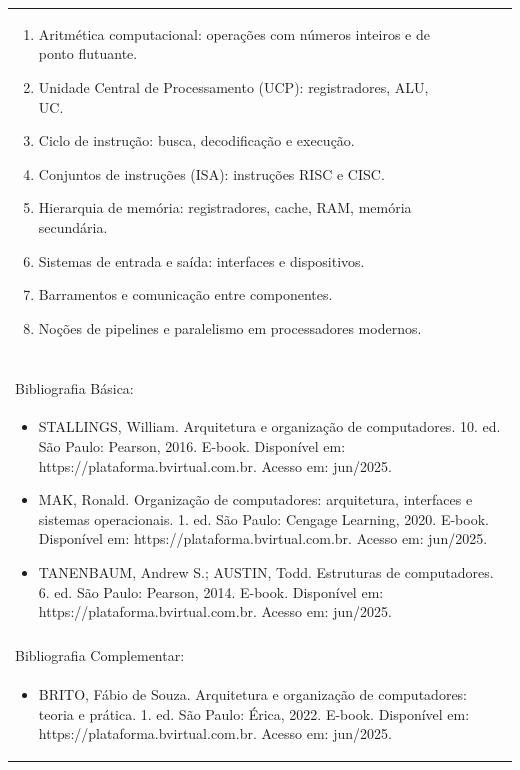 \documentclass[11pt]{article}
\begin{document}
\begin{center}
\begin{longtable}{|p{4cm}|p{4cm}|p{4cm}|p{4cm}|}
{\begin{enumerate}
\item Aritmética computacional: operações com números inteiros e de ponto flutuante.
\item Unidade Central de Processamento (UCP): registradores, ALU, UC.
\item Ciclo de instrução: busca, decodificação e execução.
\item Conjuntos de instruções (ISA): instruções RISC e CISC.
\item Hierarquia de memória: registradores, cache, RAM, memória secundária.
\item Sistemas de entrada e saída: interfaces e dispositivos.
\item Barramentos e comunicação entre componentes.
\item Noções de pipelines e paralelismo em processadores modernos.\end{enumerate}}\\
\multicolumn{4}{|p{16cm}|}{}\\
\multicolumn{4}{|p{16cm}|}{}\\
\multicolumn{4}{|p{16cm}|}{\vspace{-1cm}}\\
\multicolumn{4}{|p{16cm}|}{}\\
\hline
\multicolumn{4}{|p{16cm}|}{Bibliografia Básica:}\\
\multicolumn{4}{|p{16cm}|}{%
\begin{itemize}\item STALLINGS, William. Arquitetura e organização de computadores. 10. ed. São Paulo: Pearson, 2016. E-book. Disponível em: https://plataforma.bvirtual.com.br. Acesso em: jun/2025.
\item MAK, Ronald. Organização de computadores: arquitetura, interfaces e sistemas operacionais. 1. ed. São Paulo: Cengage Learning, 2020. E-book. Disponível em: https://plataforma.bvirtual.com.br. Acesso em: jun/2025.
\item TANENBAUM, Andrew S.; AUSTIN, Todd. Estruturas de computadores. 6. ed. São Paulo: Pearson, 2014. E-book. Disponível em: https://plataforma.bvirtual.com.br. Acesso em: jun/2025.\end{itemize}}\\
\multicolumn{4}{|p{16cm}|}{}\\
\hline
\multicolumn{4}{|p{16cm}|}{Bibliografia Complementar:}\\
\multicolumn{4}{|p{16cm}|}{%
\begin{itemize}\item BRITO, Fábio de Souza. Arquitetura e organização de computadores: teoria e prática. 1. ed. São Paulo: Érica, 2022. E-book. Disponível em: https://plataforma.bvirtual.com.br. Acesso em: jun/2025.

\end{itemize}}
\end{longtable}
\end{center}
\end{document}
